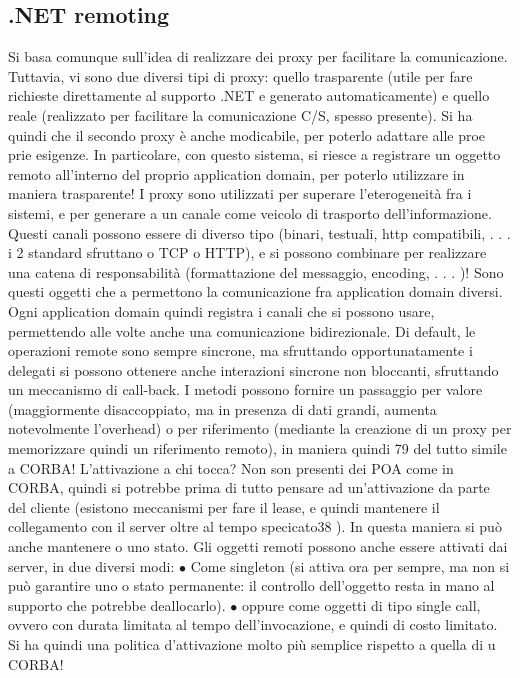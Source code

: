 \documentclass[a4paper,12pt]{article}
\begin{document}
\subsection{.NET remoting}
Si basa comunque sull'idea di realizzare dei proxy per facilitare la comunicazione.
Tuttavia, vi sono due diversi tipi di proxy: quello trasparente (utile per fare
richieste direttamente al supporto .NET e generato automaticamente) e quello
reale (realizzato per facilitare la comunicazione C/S, spesso presente). Si ha
quindi che il secondo proxy è anche modicabile, per poterlo adattare alle proe
prie esigenze. In particolare, con questo sistema, si riesce a registrare un oggetto remoto all'interno del proprio
application domain, per poterlo utilizzare in
maniera trasparente!
I proxy sono utilizzati per superare l'eterogeneità fra i sistemi, e per generare
a
un canale come veicolo di trasporto dell'informazione. Questi canali possono essere di diverso tipo (binari, testuali,
http compatibili, . . . i 2 standard sfruttano
o TCP o HTTP), e si possono combinare per realizzare una catena di responsabilità (formattazione del messaggio,
encoding, . . . )! Sono questi oggetti che
a
permettono la comunicazione fra application domain diversi. Ogni application
domain quindi registra i canali che si possono usare, permettendo alle volte anche una comunicazione bidirezionale.
Di default, le operazioni remote sono sempre sincrone, ma sfruttando opportunatamente i delegati si possono ottenere
anche interazioni sincrone non
bloccanti, sfruttando un meccanismo di call-back. I metodi possono fornire un
passaggio per valore (maggiormente disaccoppiato, ma in presenza di dati grandi, aumenta notevolmente l'overhead) o per
riferimento (mediante la creazione
di un proxy per memorizzare quindi un riferimento remoto), in maniera quindi
79
del tutto simile a CORBA!
L'attivazione a chi tocca? Non son presenti dei POA come in CORBA,
quindi si potrebbe prima di tutto pensare ad un'attivazione da parte del cliente
(esistono meccanismi per fare il lease, e quindi mantenere il collegamento con il
server oltre al tempo specicato38 ). In questa maniera si può anche mantenere
o
uno stato.
Gli oggetti remoti possono anche essere attivati dai server, in due diversi
modi:
$\bullet$ Come singleton (si attiva ora per sempre, ma non si può garantire uno
o
stato permanente: il controllo dell'oggetto resta in mano al supporto che
potrebbe deallocarlo).
$\bullet$ oppure come oggetti di tipo single call, ovvero con durata limitata al tempo
dell'invocazione, e quindi di costo limitato.
Si ha quindi una politica d'attivazione molto più semplice rispetto a quella di
u
CORBA!
\end{document}
